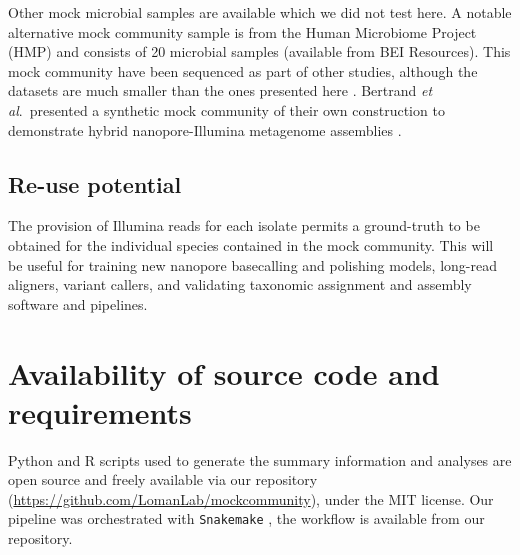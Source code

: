 \documentclass[a4paper,num-refs]{oup-contemporary}
\begin{document}

Other mock microbial samples are available which we did not test here. A notable alternative mock community sample is from the Human Microbiome Project (HMP) and consists of 20 microbial samples (available from BEI Resources). This mock community have been sequenced as part of other studies, although the datasets are much smaller than the ones presented here \cite{Leggett2017-sx,Huson2018-bh}. Bertrand \textit{et al}.\ presented a synthetic mock community of their own construction to demonstrate hybrid nanopore-Illumina metagenome assemblies \cite{Bertrand2018-lz}.

\subsection{Re-use potential}
The provision of Illumina reads for each isolate permits a ground-truth to be obtained for the individual species contained in the mock community. This will be useful for training new nanopore basecalling and polishing models, long-read aligners, variant callers, and validating taxonomic assignment and assembly software and pipelines.



\section{Availability of source code and requirements}
Python and R scripts used to generate the summary information and analyses are open source and freely available via our repository (\url{https://github.com/LomanLab/mockcommunity}), under the MIT license.
Our pipeline was orchestrated with \texttt{Snakemake} \cite{koster2012snakemake}, the workflow is available from our repository.

\end{document}
